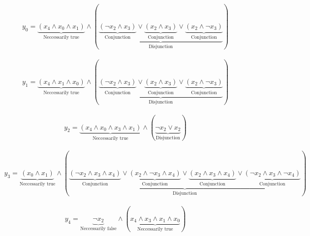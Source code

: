 \documentclass[margin=300pt,preview,fleqn,varwidth]{standalone}
\begin{document}
	
\begin{equation}\begin{aligned}
	y_0 = \underbrace{\left(x_4 \wedge x_0 \wedge x_1\right)}_{\text{Neccessarily true}} \wedge (\underbrace{\underbrace{\left( \lnot x_2 \wedge x_3\right)}_{\text{Conjunction}} \lor \underbrace{\left(x_2 \wedge x_3\right)}_{\text{Conjunction}} \lor \underbrace{\left(x_2 \wedge  \lnot x_3\right)}_{\text{Conjunction}}}_{\text{Disjunction}})
\end{aligned}\end{equation}

\begin{equation}\begin{aligned}
	y_1 = \underbrace{\left(x_4 \wedge x_1 \wedge x_0\right)}_{\text{Neccessarily true}} \wedge (\underbrace{\underbrace{\left( \lnot x_2 \wedge x_3\right)}_{\text{Conjunction}} \lor \underbrace{\left(x_2 \wedge x_3\right)}_{\text{Conjunction}} \lor \underbrace{\left(x_2 \wedge  \lnot x_3\right)}_{\text{Conjunction}}}_{\text{Disjunction}})
\end{aligned}\end{equation}

\begin{equation}\begin{aligned}
	y_2 = \underbrace{\left(x_4 \wedge x_0 \wedge x_3 \wedge x_1\right)}_{\text{Neccessarily true}} \wedge (\underbrace{ \lnot x_2 \lor x_2}_{\text{Disjunction}})
\end{aligned}\end{equation}

\begin{equation}\begin{aligned}
	y_3 = \underbrace{\left(x_0 \wedge x_1\right)}_{\text{Neccessarily true}} \wedge (\underbrace{\underbrace{\left( \lnot x_2 \wedge x_3 \wedge x_4\right)}_{\text{Conjunction}} \lor \underbrace{\left(x_2 \wedge  \lnot x_3 \wedge x_4\right)}_{\text{Conjunction}} \lor \underbrace{\left(x_2 \wedge x_3 \wedge x_4\right)}_{\text{Conjunction}} \lor \underbrace{\left( \lnot x_2 \wedge x_3 \wedge  \lnot x_4\right)}_{\text{Conjunction}}}_{\text{Disjunction}})
\end{aligned}\end{equation}

\begin{equation}\begin{aligned}
	y_4 = \underbrace{ \lnot x_2}_{\text{Neccessarily false}} \wedge (\underbrace{x_4 \wedge x_3 \wedge x_1 \wedge x_0}_{\text{Neccessarily true}})
\end{aligned}\end{equation}
\end{document}
